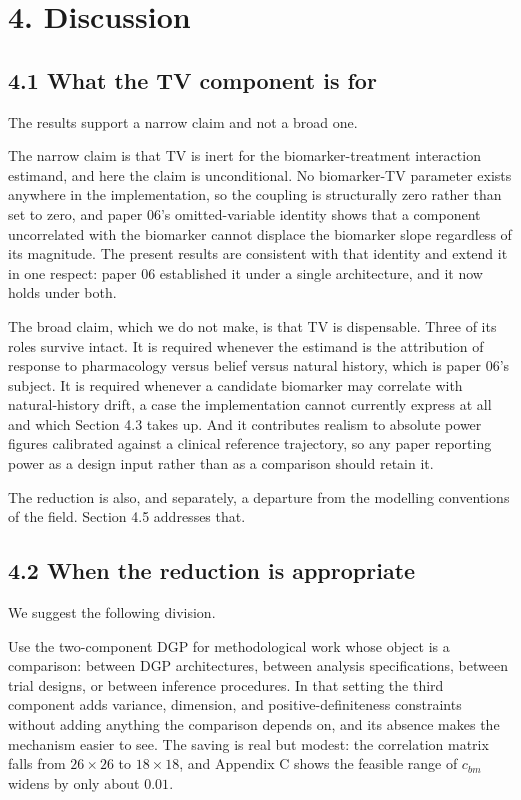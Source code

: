 \documentclass[
  11pt,
]{article}
\begin{document}
\section{4. Discussion}

\subsection{4.1 What the TV component is for}

The results support a narrow claim and not a broad one.

The narrow claim is that TV is inert for the biomarker-treatment
interaction estimand, and here the claim is unconditional. No
biomarker-TV parameter exists anywhere in the implementation, so the
coupling is structurally zero rather than set to zero, and paper 06's
omitted-variable identity shows that a component uncorrelated with
the biomarker cannot displace the biomarker slope regardless of its
magnitude. The present results are consistent with that identity and
extend it in one respect: paper 06 established it under a single
architecture, and it now holds under both.

The broad claim, which we do not make, is that TV is dispensable.
Three of its roles survive intact. It is required whenever the
estimand is the attribution of response to pharmacology versus belief
versus natural history, which is paper 06's subject. It is required
whenever a candidate biomarker may correlate with natural-history
drift, a case the implementation cannot currently express at all and
which Section 4.3 takes up. And it contributes realism to absolute
power figures calibrated against a clinical reference trajectory, so
any paper reporting power as a design input rather than as a
comparison should retain it.

The reduction is also, and separately, a departure from the modelling
conventions of the field. Section 4.5 addresses that.

\subsection{4.2 When the reduction is appropriate}

We suggest the following division.

Use the two-component DGP for methodological work whose object is a
comparison: between DGP architectures, between analysis
specifications, between trial designs, or between inference
procedures. In that setting the third component adds variance,
dimension, and positive-definiteness constraints without adding
anything the comparison depends on, and its absence makes the
mechanism easier to see. The saving is real but modest: the
correlation matrix falls from \(26 \times 26\) to \(18 \times 18\), and
Appendix C shows the feasible range of \(c_{bm}\) widens by only about
\(0.01\).
\end{document}
